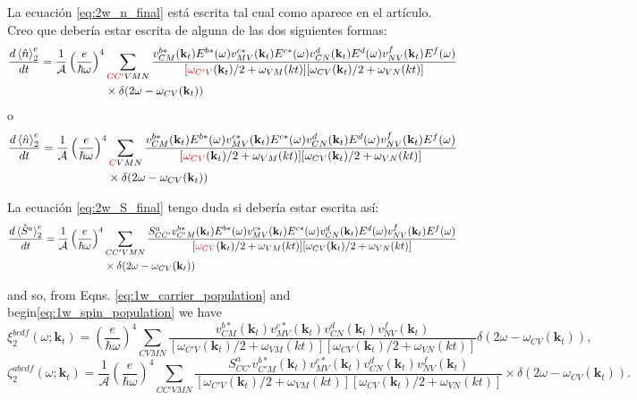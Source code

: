 \documentclass{article}
\newcommand{\kt}{\mathbf{k}_{t}}
\newcommand{\dw}{\delta(2\omega - \omega_{CV}(\kt))}
\begin{document}
{\color{blue} La ecuaci\'on \eqref{eq:2w_n_final} est\'a escrita tal cual
como aparece en el art\'iculo. Creo que deber\'ia estar escrita de alguna de las 
dos siguientes formas:
\begin{equation*}
\begin{split}
\frac{d\ev*{\hat{n}}^{e}_2}{dt} = \frac{1}{\mathcal{A}} \left(\frac{e}{\hbar\omega}\right)^{4} &
\sum_{{\color{red}CC'}VMN} \frac{v^{b*}_{CM}(\kt) E^{b*}(\omega)v^{c*}_{MV}(\kt) E^{c*}(\omega)
v^{d}_{CN}(\kt) E^{d}(\omega)v^{f}_{NV}(\kt) E^{f}(\omega)}
{[{\color{red}\omega_{C'V}}(\kt)/2+\omega_{VM}(kt)][\omega_{CV}(\kt)/2+\omega_{VN}(kt)]} \\
& \times \dw
\end{split}
\end{equation*}
o
\begin{equation*}
\begin{split}
\frac{d\ev*{\hat{n}}^{e}_2}{dt} = \frac{1}{\mathcal{A}} \left(\frac{e}{\hbar\omega}\right)^{4} &
\sum_{{\color{red}C}VMN} \frac{v^{b*}_{CM}(\kt) E^{b*}(\omega)v^{c*}_{MV}(\kt) E^{c*}(\omega)
v^{d}_{CN}(\kt) E^{d}(\omega)v^{f}_{NV}(\kt) E^{f}(\omega)}
{[{\color{red}\omega_{CV}}(\kt)/2+\omega_{VM}(kt)][\omega_{CV}(\kt)/2+\omega_{VN}(kt)]} \\
& \times \dw
\end{split}
\end{equation*}

La ecuaci\'on \eqref{eq:2w_S_final} tengo duda si deber\'ia estar escrita as\'i:
\begin{equation}
\begin{split}
\frac{d\ev*{\hat{S}^{a}}^{e}_2}{dt}= \frac{1}{\mathcal{A}} \left(\frac{e}{\hbar\omega}\right)^{4} &
\sum_{CC'VMN} \frac{S^{a}_{CC'} v^{b*}_{C'M}(\kt) E^{b*}(\omega)v^{c*}_{MV}(\kt) E^{c*}(\omega)
v^{d}_{CN}(\kt) E^{d}(\omega)v^{f}_{NV}(\kt) E^{f}(\omega)}
{[{\color{red}\omega_{CV}}(\kt)/2+\omega_{VM}(kt)][\omega_{CV}(\kt)/2 + \omega_{VN}(kt)]} \\
& \times \dw 
\end{split}
\end{equation}
}

and so, from Eqns. \eqref{eq:1w_carrier_population} and
begin\eqref{eq:1w_spin_population} we have 
\begin{equation}
\xi^{bcdf}_{2}(\omega;\kt) = \left(\frac{e}{\hbar\omega}\right)^{4}
\sum_{CVMN} \frac{v^{b*}_{CM}(\kt)v^{c*}_{MV}(\kt)
v^{d}_{CN}(\kt)v^{f}_{NV}(\kt)}
{[\omega_{C'V}(\kt)/2+\omega_{VM}(kt)][\omega_{CV}(\kt)/2+\omega_{VN}(kt)]} 
\dw,
\end{equation}
\begin{equation}\label{eq:2_spin_tensor}
\zeta^{abcdf}_{2}(\omega;\kt) = \frac{1}{\mathcal{A}} \left(\frac{e}{\hbar\omega}\right)^{4} 
\sum_{CC'VMN} \frac{S^{a}_{CC'} v^{b*}_{C'M}(\kt)v^{c*}_{MV}(\kt)
v^{d}_{CN}(\kt)v^{f}_{NV}(\kt)}
{[\omega_{C'V}(\kt)/2+\omega_{VM}(kt)][\omega_{CV}(\kt)/2+\omega_{VN}(kt)]} \times \dw.
\end{equation}
\end{document}
